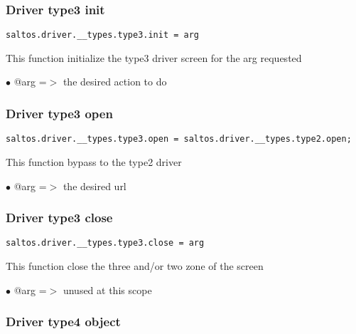 \documentclass[a4paper]{article}
\begin{document}
\hypertarget{toc751}{}
\subsubsection{Driver type3 init}

\begin{lstlisting}
saltos.driver.__types.type3.init = arg
\end{lstlisting}

This function initialize the type3 driver screen for the arg requested

\begin{compactitem}
\item[\color{myblue}$\bullet$] @arg =$>$ the desired action to do
\end{compactitem}

\hypertarget{toc752}{}
\subsubsection{Driver type3 open}

\begin{lstlisting}
saltos.driver.__types.type3.open = saltos.driver.__types.type2.open;
\end{lstlisting}

This function bypass to the type2 driver

\begin{compactitem}
\item[\color{myblue}$\bullet$] @arg =$>$ the desired url
\end{compactitem}

\hypertarget{toc753}{}
\subsubsection{Driver type3 close}

\begin{lstlisting}
saltos.driver.__types.type3.close = arg
\end{lstlisting}

This function close the three and/or two zone of the screen

\begin{compactitem}
\item[\color{myblue}$\bullet$] @arg =$>$ unused at this scope
\end{compactitem}

\hypertarget{toc754}{}
\subsubsection{Driver type4 object}
\end{document}
